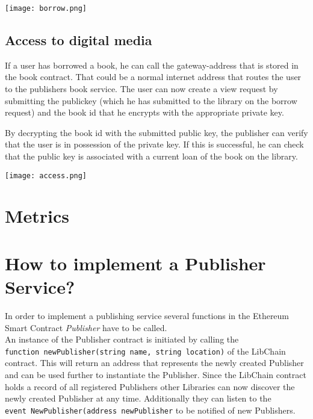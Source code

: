 \vspace{0.3cm}
\begin{center}
\texttt{[image: borrow.png]}
\end{center}

\subsection{Access to digital media \label{sssec:access}}
If a user has borrowed a book, he can call the gateway-address that is stored in the book contract. That could be a normal internet address that routes the user to the publishers book service.
The user can now create a view request by submitting the publickey (which he has submitted to the library on the borrow request) and the book id that he encrypts with the appropriate private key.

By decrypting the book id with the submitted public key, the publisher can verify that the user is in possession of the private key. If this is successful, he can check that the public key is associated with a current loan of the book on the library.


\vspace{0.3cm}
\begin{center}
\texttt{[image: access.png]}
\end{center}

\section{Metrics}

\section{How to implement a Publisher Service?}
In order to implement a publishing service several functions in the Ethereum Smart Contract \textit{Publisher} have to be called. \\
An instance of the Publisher contract is initiated by calling the \\
 \verb|function newPublisher(string name, string location)| of the LibChain contract. This will return an address that represents the newly created Publisher and can be used further to instantiate the Publisher. Since the LibChain contract holds a record of all registered Publishers other Libraries can now discover the newly created Publisher at any time. Additionally they can listen to the \\
 \verb|event NewPublisher(address newPublisher| to be notified of new Publishers.
